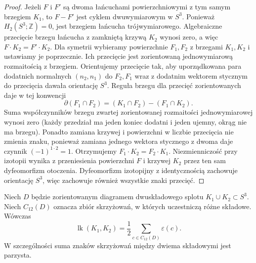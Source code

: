 \begin{proof}
Jeżeli $F$ i $F'$ są dwoma łańcuchami powierzchniowymi z tym samym
brzegiem $K_1$, to $F-F'$ jest cyklem dwuwymiarowym w $S^3$.
Ponieważ $H_2(S^3;\mathbb Z)=0$, jest brzegiem łańcucha
trójwymiarowego. Algebraiczne przecięcie brzegu łańcucha z zamkniętą
krzywą $K_2$ wynosi zero, a więc $F\cdot K_2=F'\cdot K_2$.
Dla symetrii wybieramy powierzchnie $F_1,F_2$ z brzegami
$K_1,K_2$ i ustawiamy je poprzecznie. Ich przecięcie jest
zorientowaną jednowymiarową rozmaitością z brzegiem.
Orientujemy przecięcie tak, aby uporządkowana para
dodatnich normalnych $(n_2,n_1)$ do $F_2,F_1$ wraz
z dodatnim wektorem stycznym do przecięcia dawała
orientację $S^3$. Reguła brzegu dla przecięć
zorientowanych daje w tej konwencji
\[
\partial(F_1\cap F_2)=(K_1\cap F_2)-(F_1\cap K_2).
\]
Suma współczynników brzegu zwartej zorientowanej
rozmaitości jednowymiarowej wynosi zero (każdy przedział
ma jeden koniec dodatni i jeden ujemny, okrąg nie ma brzegu).
Ponadto zamiana krzywej i powierzchni w liczbie
przecięcia nie zmienia znaku, ponieważ zamiana
jednego wektora stycznego z dwoma daje czynnik
$(-1)^{1\cdot 2}=1$. Otrzymujemy
$F_1\cdot K_2=F_2\cdot K_1$. Niezmienniczość przy izotopii wynika z
przeniesienia powierzchni $F$ i krzywej $K_2$ przez ten sam
dyfeomorfizm otoczenia. Dyfeomorfizm izotopijny z identycznością
zachowuje orientację $S^3$, więc zachowuje również wszystkie
znaki przecięć.
\end{proof}

\begin{twierdzenie}
Niech $D$ będzie zorientowanym diagramem dwuskładowego splotu
$K_1\cup K_2\subset S^3$. Niech $C_{12}(D)$ oznacza zbiór
skrzyżowań, w których uczestniczą różne składowe. Wówczas
\[
\operatorname{lk}(K_1,K_2)=\frac12\sum_{c\in C_{12}(D)}\varepsilon(c).
\]
W szczególności suma znaków skrzyżowań między dwiema składowymi
jest parzysta.
\end{twierdzenie}

